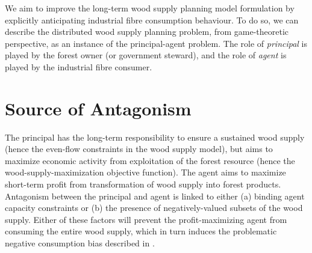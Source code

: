 We aim to improve the long-term wood supply planning model formulation by explicitly anticipating industrial fibre consumption behaviour. To do so, we can describe the distributed wood supply planning problem, from game-theoretic perspective, as an instance of the principal-agent problem. 
The role of \emph{principal} is played by the forest owner (or government steward), and the role of \emph{agent} is played by the industrial fibre consumer. 

\section{Source of Antagonism}

The principal has the long-term responsibility to ensure a sustained wood supply (hence the even-flow constraints in the wood supply model), but aims to maximize economic activity from exploitation of the forest resource (hence the wood-supply-maximization objective function).
The agent aims to maximize short-term profit from transformation of wood supply into forest products.
Antagonism between the principal and agent is linked to either (a) binding agent capacity constraints or (b) the presence of negatively-valued subsets of the wood supply. 
Either of these factors will prevent the profit-maximizing agent from consuming the entire wood supply, which in turn induces the problematic negative consumption bias described in \citet{paradis2013risk}.

